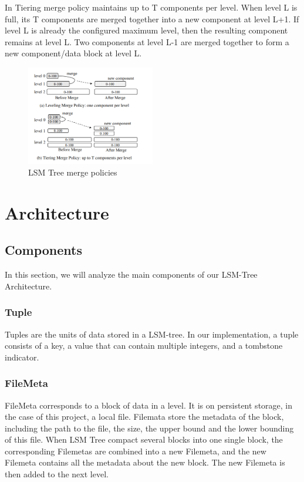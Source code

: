 \documentclass[sigconf]{acmart}
\begin{document}
    In Tiering merge policy maintains up to T components per level. When level L is full, its T components are merged together into a new component at level L+1. If level L is already the configured maximum level, then the resulting component remains at level L. Two components at level L-1 are merged together to form a new component/data block at level L.\\
    \begin{figure}[H]
        \centering
        \includegraphics[width=0.5\textwidth]{MergingStrategies.PNG}
        \caption{LSM Tree merge policies}
        \label{Fig.main}
    \end{figure}
    \section{Architecture}
    \subsection{Components}
    In this section, we will analyze the main components of our LSM-Tree Architecture.
    \subsubsection{Tuple}
    Tuples are the units of data stored in a LSM-tree. In our implementation, a tuple consists of a key, a value that can contain multiple integers, and a tombstone indicator.
    \subsubsection{FileMeta}
    FileMeta corresponds to a block of data in a level. It is on persistent storage, in the case of this project, a local file. Filemata store the metadata of the block, including the path to the file, the size, the upper bound and the lower bounding of this file. When LSM Tree compact several blocks into one single block, the corresponding Filemetas are combined into a new Filemeta, and the new Filemeta contains all the metadata about the new block. The new Filemeta is then added to the next level.
\end{document}
